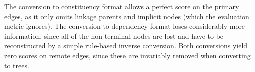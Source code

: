 \documentclass[11pt]{article}
\begin{document}

The conversion to constituency format allows a perfect score on the
primary edges, as it only omits linkage parents and implicit nodes (which the evaluation metric ignores).
The conversion to dependency format loses considerably more information, since all of the non-terminal nodes are lost and have to be reconstructed by a simple rule-based inverse conversion.
Both conversions yield zero scores on remote edges, since these are invariably removed when converting to trees.
\end{document}

